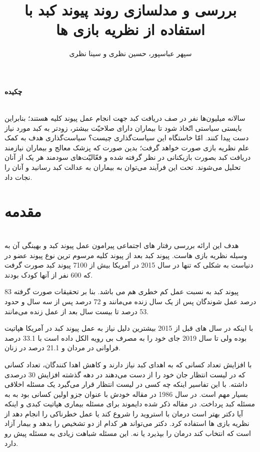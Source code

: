 \documentclass[12pt]{article}
\title{بررسی و مدلسازی روند پیوند کبد با استفاده از نظریه بازی ها}
\author{سپهر عباسپور، حسین نظری و سینا نظری}
\begin{document}
\maketitle
\begin{center}
\Large
 \textbf{چکیده}
\end{center}
\\
\normalsize
سالانه میلیون‌ها نفر در صف دریافت کبد جهت انجام عمل پیوند کلیه هستند؛ بنابراین بایستی سیاستی اتّخاذ شود تا بیماران دارای صلاحیّت بیشتر، زودتر به کبد مورد نیاز دست پیدا کنند.
امّا خاستگاه این سیاست‌گذاری چیست؟
سیاست‌گذاری هدف به کمک علم نظریه بازی صورت خواهد گرفت؛ بدین صورت که پزشک معالج و بیماران نیازمند دریافت کبد بصورت بازیکنانی در نظر گرفته شده و فعّالیّت‌های سودمند هر یک از آنان تحلیل می‌شوند.
تحت این فرآیند می‌توان به بیماران به عدالت کبد رسانید و آنان را نجات داد.
\\
\section{مقدمه}
\\

هدف این ارائه بررسی رفتار های اجتماعی پیرامون عمل
پیوند کبد و بهینگی آن به وسیله نظریه بازی هاست.
پیوند کبد بعد از پیوند کلیه مرسوم ترین نوع پیوند عضو در دنیاست به
شکلی که تنها در سال 2015 در آمریکا بیش از 7100 پیوند کبد
صورت گرفت که 600 نفر از آنها کودک بودند.

پیوند کبد به نسبت عمل کم خطری هم می باشد. بنا بر تحقیقات صورت
گرفته 83 درصد عمل شوندگان پس از یک سال زنده می‌مانند و 72 درصد پس
از سه سال و حدود 53 درصد تا بیست سال بعد از عمل زنده می‌مانند.

با اینکه در سال های قبل از 2015 بیشترین دلیل نیاز به عمل پیوند کبد
در آمریکا هپاتیت  بوده ولی تا سال 2019 جای خود را به مصرف
بی رویه الکل داده است با 33.1 درصد فراوانی در مردان و 21.1 درصد در
زنان.

با افزایش تعداد کسانی که به اهدای کبد نیاز دارند و کاهش اهدا کنندگان،
تعداد کسانی که در لیست انتظار جان خود را از دست می‌دهند در دهه
گذشته افزایش 30 درصدی داشته.
با این تفاسیر اینکه چه کسی در لیست انتظار قرار می‌گیرد یک مسئله اخلاقی بسیار مهم است.
در سال 1986 در مقاله خودش با عنوان  جزو اولین کسانی بود به به مسئله کبد پرداخت. در مقاله ذکر
شده دایموند برای مسئله بیماری هپاتیت کبدی و اینکه آیا دکتر بهتر است درمان با استروید را
شروع کند یا عمل خطرناکی را انجام دهد از نظریه بازی ها استفاده کرد. دکتر می‌تواند هر کدام
از دو تشخیص را بدهد و بیمار آزاد است که انتخاب کند درمان را بپذیرد یا نه. این مسئله شباهت
زیادی به مسئله پیش رو دارد.
\\
\end{document}
